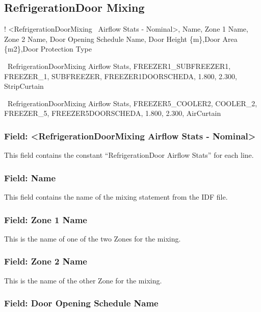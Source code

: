\subsection{RefrigerationDoor Mixing}\label{refrigerationdoor-mixing}

! \textless{}RefrigerationDoorMixing~ Airflow Stats - Nominal\textgreater{}, Name, Zone 1 Name, Zone 2 Name, Door Opening Schedule Name, Door Height \{m\},Door Area \{m2\},Door Protection Type

~RefrigerationDoorMixing Airflow Stats, FREEZER1\_SUBFREEZER1, FREEZER\_1, SUBFREEZER, FREEZER1DOORSCHEDA, 1.800, 2.300, StripCurtain

~RefrigerationDoorMixing Airflow Stats, FREEZER5\_COOLER2, COOLER\_2, FREEZER\_5, FREEZER5DOORSCHEDA, 1.800, 2.300, AirCurtain

\subsubsection{Field: \textless{}RefrigerationDoorMixing Airflow Stats - Nominal\textgreater{}}\label{field-refrigerationdoormixing-airflow-stats---nominal}

This field contains the constant ``RefrigerationDoor Airflow Stats'' for each line.

\subsubsection{Field: Name}\label{field-name-10}

This field contains the name of the mixing statement from the IDF file.

\subsubsection{Field: Zone 1 Name}\label{field-zone-1-name}

This is the name of one of the two Zones for the mixing.

\subsubsection{Field: Zone 2 Name}\label{field-zone-2-name}

This is the name of the other Zone for the mixing.

\subsubsection{Field: Door Opening Schedule Name}\label{field-door-opening-schedule-name}

